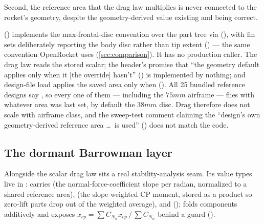Second, the reference area that the drag law multiplies is never connected to the rocket's
geometry, despite the geometry-derived value existing and being correct.

\begin{hardfail}
 () implements
the max-frontal-disc convention over the part tree via 
(), with fin sets deliberately reporting the body disc rather than
tip extent () --- the same convention OpenRocket uses
(\cref{sec:comparison}). It has no production caller. The drag law reads the stored  scalar; the header's promise
that ``the geometry default applies only when it [the override] hasn't''
() is implemented by nothing; and design-file load applies the saved
area only when  (). All
25 bundled reference designs say , so every one of them --- including the
$75\unit{mm}$  airframe --- flies with whatever area was last set, by default the
$38\unit{mm}$ disc. Drag therefore does not scale with airframe class, and the sweep-test comment
claiming the ``design's own geometry-derived reference area \ldots\ is used''
() does not match the code. \fail
\end{hardfail}

\subsection{The dormant Barrowman layer}\label{sec:aero-barrowman}

Alongside the scalar drag law sits a real stability-analysis seam. Its value types live in
:  carries  (the normal-force-coefficient slope
per radian, normalized to a shared reference area),  (the slope-weighted CP
moment, stored as a product so zero-lift parts drop out of the weighted average), and 
();  folds components additively and exposes
$x_{cp} = \sum C_{N_\alpha} x_{cp} \,/\, \sum C_{N_\alpha}$ behind a  guard
().

